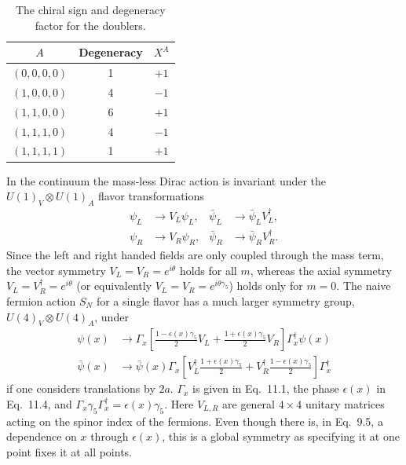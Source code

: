 \begin{table}[htbp]
\centering
\begin{tabular}{ccc}
\toprule
$A$ & Degeneracy & $X^A$ \\
\midrule
$(0, 0, 0, 0)$ & 1 & $+1$ \\
$(1, 0, 0, 0)$ & 4 & $-1$ \\
$(1, 1, 0, 0)$ & 6 & $+1$ \\
$(1, 1, 1, 0)$ & 4 & $-1$ \\
$(1, 1, 1, 1)$ & 1 & $+1$ \\
\bottomrule
\end{tabular}
\caption{The chiral sign and degeneracy factor for the doublers.}
\label{tab:3}
\end{table}

In the continuum the mass-less Dirac action is invariant under the
$U(1)_V \otimes U(1)_A$ flavor transformations
\begin{equation}
\begin{aligned}
\psi_L &\to V_L \psi_L , & \bar{\psi}_L &\to \bar{\psi}_L V_L^\dagger , \\
\psi_R &\to V_R \psi_R , & \bar{\psi}_R &\to \bar{\psi}_R V_R^\dagger .
\end{aligned}
\end{equation}
Since the left and right handed fields are only coupled through the mass
term, the vector symmetry $V_L = V_R = e^{i\theta}$ holds for all $m$, whereas the
axial symmetry $V_L = V_R^\dagger = e^{i\theta}$ (or equivalently $V_L = V_R = e^{i\theta\gamma_5}$) holds
only for $m = 0$. The naive fermion action $S_N$ for a single flavor has a much
larger symmetry group, $U(4)_V \otimes U(4)_A$, under
\begin{equation}
\begin{aligned}
\psi(x) &\to \Gamma_x \left[ \frac{1 - \epsilon(x)\gamma_5}{2} V_L + \frac{1 + \epsilon(x)\gamma_5}{2} V_R \right] \Gamma_x^\dagger \psi(x) \\
\bar{\psi}(x) &\to \bar{\psi}(x) \Gamma_x \left[ V_L^\dagger \frac{1 + \epsilon(x)\gamma_5}{2} + V_R^\dagger \frac{1 - \epsilon(x)\gamma_5}{2} \right] \Gamma_x^\dagger
\end{aligned}
\end{equation}
if one considers translations by $2a$. $\Gamma_x$ is given in Eq.~11.1, the phase
$\epsilon(x)$ in Eq.~11.4, and $\Gamma_x \gamma_5 \Gamma_x^\dagger = \epsilon(x)\gamma_5$.
Here $V_{L,R}$ are general $4 \times 4$ unitary matrices acting on the spinor
index of the fermions. Even though there is, in Eq.~9.5, a dependence on $x$
through $\epsilon(x)$, this is a global symmetry as specifying it at one point
fixes it at all points.

